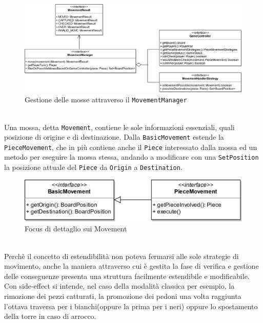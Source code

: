 \documentclass[a4paper,12pt]{report}
\begin{document}
\begin{figure}[H]
\centering{}
\includegraphics[width=\textwidth]{img/Stefano/CompleteMovementManager.png}
\caption{Gestione delle mosse attraverso il \texttt{MovementManager}}
\label{img:CompleteMovementManager}
\end{figure}
\
\\
%
Una mossa, detta \texttt{Movement}, contiene le sole informazioni essenziali, quali posizione di origine e di destinazione. Dalla \texttt{BasicMovement} estende la \texttt{PieceMovement}, che in più contiene anche il \texttt{Piece} interessato dalla mossa ed un metodo per eseguire la mossa stessa, andando a modificare con una \texttt{SetPosition} la posizione attuale del \texttt{Piece} da \texttt{Origin} a \texttt{Destination}.
\begin{figure}[H]
\centering{}
\includegraphics[scale=0.8]{img/Stefano/Movement.png}
\caption{Focus di dettaglio sui Movement}
\label{img:Movement}
\end{figure}
\
\\
%
Perchè il concetto di estendibilità non poteva fermarsi alle sole strategie di movimento, anche la maniera attraverso cui è gestita la fase di verifica e gestione delle conseguenze presenta una struttura facilmente estendibile e modificabile.\\
Con side-effect si intende, nel caso della modalità classica per esempio, la rimozione dei pezzi catturati, la promozione dei pedoni una volta raggiunta l'ottava traversa per i bianchi(oppure la prima per i neri) oppure lo spostamento della torre in caso di arrocco.
\end{document}
